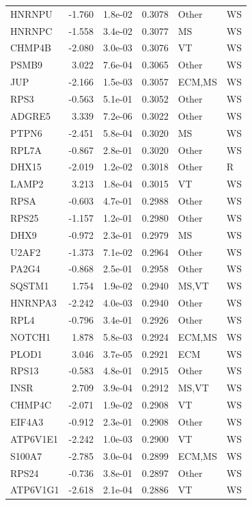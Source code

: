 \begin{table}[ht]
\begin{tabular}{lrlrll}
  HNRNPU & -1.760 & 1.8e-02 & 0.3078 & Other & WS \\ 
  HNRNPC & -1.558 & 3.4e-02 & 0.3077 & MS & WS \\ 
  CHMP4B & -2.080 & 3.0e-03 & 0.3076 & VT & WS \\ 
  PSMB9 & 3.022 & 7.6e-04 & 0.3065 & Other & WS \\ 
  JUP & -2.166 & 1.5e-03 & 0.3057 & ECM,MS & WS \\ 
  RPS3 & -0.563 & 5.1e-01 & 0.3052 & Other & WS \\ 
  ADGRE5 & 3.339 & 7.2e-06 & 0.3022 & Other & WS \\ 
  PTPN6 & -2.451 & 5.8e-04 & 0.3020 & MS & WS \\ 
  RPL7A & -0.867 & 2.8e-01 & 0.3020 & Other & WS \\ 
  DHX15 & -2.019 & 1.2e-02 & 0.3018 & Other & R \\ 
  LAMP2 & 3.213 & 1.8e-04 & 0.3015 & VT & WS \\ 
  RPSA & -0.603 & 4.7e-01 & 0.2988 & Other & WS \\ 
  RPS25 & -1.157 & 1.2e-01 & 0.2980 & Other & WS \\ 
  DHX9 & -0.972 & 2.3e-01 & 0.2979 & MS & WS \\ 
  U2AF2 & -1.373 & 7.1e-02 & 0.2964 & Other & WS \\ 
  PA2G4 & -0.868 & 2.5e-01 & 0.2958 & Other & WS \\ 
  SQSTM1 & 1.754 & 1.9e-02 & 0.2940 & MS,VT & WS \\ 
  HNRNPA3 & -2.242 & 4.0e-03 & 0.2940 & Other & WS \\ 
  RPL4 & -0.796 & 3.4e-01 & 0.2926 & Other & WS \\ 
  NOTCH1 & 1.878 & 5.8e-03 & 0.2924 & ECM,MS & WS \\ 
  PLOD1 & 3.046 & 3.7e-05 & 0.2921 & ECM & WS \\ 
  RPS13 & -0.583 & 4.8e-01 & 0.2915 & Other & WS \\ 
  INSR & 2.709 & 3.9e-04 & 0.2912 & MS,VT & WS \\ 
  CHMP4C & -2.071 & 1.9e-02 & 0.2908 & VT & WS \\ 
  EIF4A3 & -0.912 & 2.3e-01 & 0.2908 & Other & WS \\ 
  ATP6V1E1 & -2.242 & 1.0e-03 & 0.2900 & VT & WS \\ 
  S100A7 & -2.785 & 3.0e-04 & 0.2899 & ECM,MS & WS \\ 
  RPS24 & -0.736 & 3.8e-01 & 0.2897 & Other & WS \\ 
  ATP6V1G1 & -2.618 & 2.1e-04 & 0.2886 & VT & WS \\ 

\end{tabular}
\end{table}
